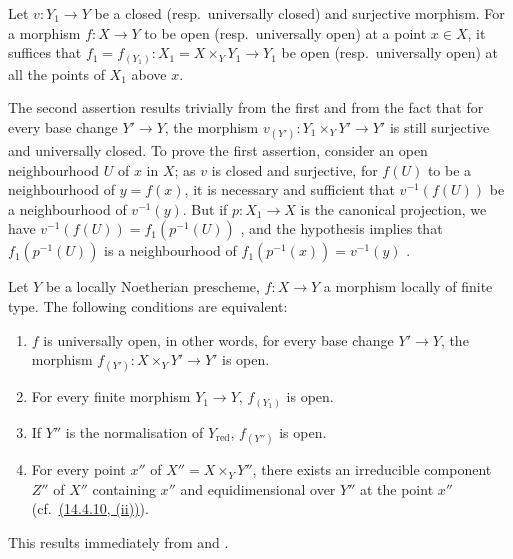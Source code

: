 \begin{lemma}[14.4.8.1]
\label{IV.14.4.8.1}
Let $v:Y_1\to Y$ be a closed (resp.\ universally closed) and surjective morphism.
For a morphism $f:X\to Y$ to be open (resp.\ universally open) at a point $x\in X$, it suffices that $f_1=f_{(Y_1)}:X_1=X\times_Y Y_1\to Y_1$ be open (resp.\ universally open) at all the points of $X_1$ above $x$.
\end{lemma}

The second assertion results trivially from the first and from the fact that for every base change $Y'\to Y$, the morphism $v_{(Y')}:Y_1\times_Y Y'\to Y'$ is still surjective and universally closed.
To prove the first assertion, consider
an open neighbourhood $U$ of $x$ in $X$; as $v$ is closed and surjective, for $f(U)$ to be a neighbourhood of $y=f(x)$, it is necessary and sufficient that $v^{-1}(f(U))$ be a neighbourhood of $v^{-1}(y)$.
But if $p:X_1\to X$ is the canonical projection, we have $v^{-1}(f(U))=f_1(p^{-1}(U))$ , and the hypothesis implies that $f_1(p^{-1}(U))$ is a neighbourhood of $f_1(p^{-1}(x))=v^{-1}(y)$ .

\begin{corollary}[14.4.9]
\label{IV.14.4.9}
Let $Y$ be a locally Noetherian prescheme, $f:X\to Y$ a morphism locally of finite type.
The following conditions are equivalent:
\begin{enumerate}[label=\emph{\alph*)}]
  \item $f$ is universally open, in other words, for every base change $Y'\to Y$, the morphism $f_{(Y')}:X\times_Y Y'\to Y'$ is open.
  \item[\emph{a$'$)}] For every finite morphism $Y_1\to Y$, $f_{(Y_1)}$ is open.
  \item[\emph{a$''$)}] If $Y''$ is the normalisation of $Y_{\mathrm{red}}$, $f_{(Y'')}$ is open.
  \item For every point $x''$ of $X''=X\times_Y Y''$, there exists an irreducible component $Z''$ of $X''$ containing $x''$ and equidimensional over $Y''$ at the point $x''$ (cf.\ \hyperref[IV.14.4.10]{(14.4.10, (ii))}).
\end{enumerate}
\end{corollary}

This results immediately from  and .

